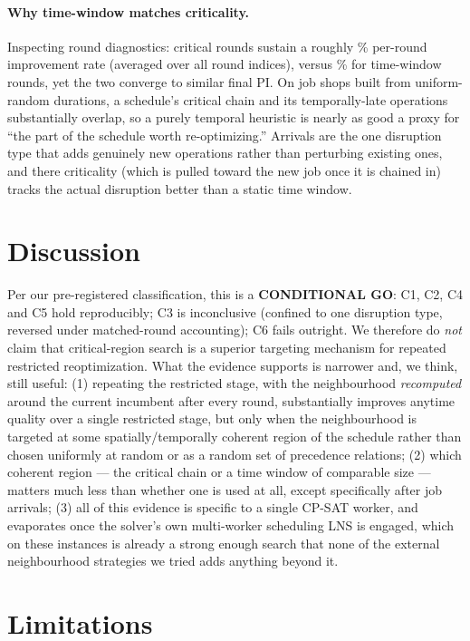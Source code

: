\documentclass[letterpaper]{article} %
\begin{document}
\paragraph{Why time-window matches criticality.} Inspecting round diagnostics: critical rounds sustain a roughly \RoundCritRate\% per-round improvement rate (averaged over all round indices), versus \RoundTimewinRate\% for time-window rounds, yet the two converge to similar final PI. On job shops built from uniform-random durations, a schedule's critical chain and its temporally-late operations substantially overlap, so a purely temporal heuristic is nearly as good a proxy for ``the part of the schedule worth re-optimizing.'' Arrivals are the one disruption type that adds genuinely new operations rather than perturbing existing ones, and there criticality (which is pulled toward the new job once it is chained in) tracks the actual disruption better than a static time window.

\section{Discussion}

Per our pre-registered classification, this is a \textbf{CONDITIONAL GO}: C1, C2, C4 and C5 hold reproducibly; C3 is inconclusive (confined to one disruption type, reversed under matched-round accounting); C6 fails outright. We therefore do \emph{not} claim that critical-region search is a superior targeting mechanism for repeated restricted reoptimization. What the evidence supports is narrower and, we think, still useful: (1) repeating the restricted stage, with the neighbourhood \emph{recomputed} around the current incumbent after every round, substantially improves anytime quality over a single restricted stage, but only when the neighbourhood is targeted at some spatially/temporally coherent region of the schedule rather than chosen uniformly at random or as a random set of precedence relations; (2) which coherent region --- the critical chain or a time window of comparable size --- matters much less than whether one is used at all, except specifically after job arrivals; (3) all of this evidence is specific to a single CP-SAT worker, and evaporates once the solver's own multi-worker scheduling LNS is engaged, which on these instances is already a strong enough search that none of the external neighbourhood strategies we tried adds anything beyond it.

\section{Limitations}
\end{document}
